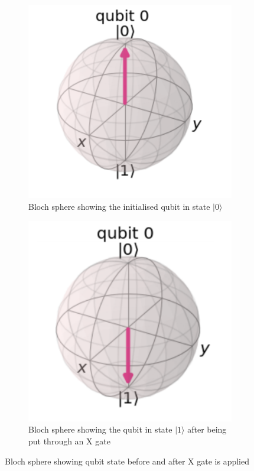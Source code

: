 \begin{figure}[h]
    \centering
    \begin{subfigure}[h]{0.4\textwidth}
        \centering
        \includegraphics[width=\textwidth]{lab2/images/bSphX1.png}
        \caption{Bloch sphere showing the initialised qubit in state $|0\rangle$}
        \label{fig:bSphX1}
    \end{subfigure}
    \hfill
    \begin{subfigure}[h]{0.4\textwidth}
        \centering
        \includegraphics[width=\textwidth]{lab2/images/bSphX2.png}
        \caption{Bloch sphere showing the qubit in state $|1\rangle$ after being put through an X gate}
        \label{fig:bSphX2}
    \end{subfigure}
    \caption{Bloch sphere showing qubit state before and after X gate is applied} 
    \label{fig:bSphereXGate}
\end{figure}


